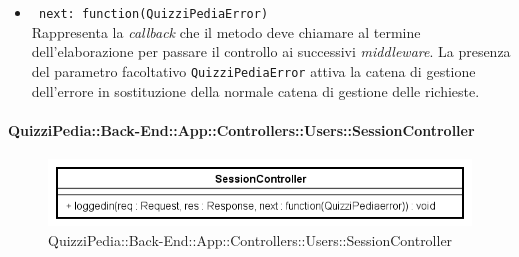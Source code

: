 \begin{itemize}
\begin{itemize}
\begin{itemize}
		  \item
			\texttt{ next: function(QuizziPediaError)} \\
			Rappresenta la \textit{callback} che il metodo deve chiamare al termine dell'elaborazione per passare il controllo ai successivi \textit{middleware}. La presenza del parametro facoltativo \texttt{QuizziPediaError} attiva la catena di gestione dell'errore in sostituzione della normale catena di gestione delle richieste.		 	
		 \end{itemize} 	 		
	\end{itemize}	
\end{itemize}	
\paragraph{QuizziPedia::Back-End::App::Controllers::Users::SessionController}
\label{QuizziPedia::Back-End::App::Controllers::Users::SessionController}
\begin{figure}[ht]
	\centering
	\includegraphics[scale=0.8]{UML/Classi/Back-End/QuizziPedia_Back-End_App_Controllers_Users_SessionController.png}
	\caption{QuizziPedia::Back-End::App::Controllers::Users::SessionController}
\end{figure}
\FloatBarrier
